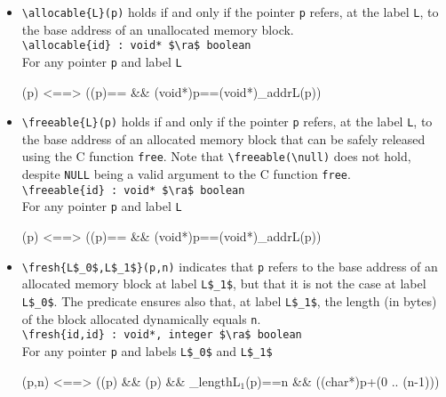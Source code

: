 \begin{itemize}
\item \lstinline|\allocable{L}(p)|
holds if and only if
the pointer \lstinline|p| refers, at the label \lstinline|L|,
to the base address of
an unallocated memory block.
\\ \makebox[5mm]{} \lstinline|\allocable{id} : void* $\ra$ boolean|
\\
For any pointer \lstinline|p| and label \lstinline|L|
\begin{listing-nonumber}
(p) <==> ((p)==\unallocated
                         && (void*)p==(void*)\base_addr{L}(p))
\end{listing-nonumber}

\item \lstinline|\freeable{L}(p)|
holds if and only if
the pointer \lstinline|p| refers, at the label \lstinline|L|,
to the base address of an allocated memory block
that can be safely released using the C function \lstinline|free|.
Note that \lstinline|\freeable(\null)| does not hold, despite \lstinline|NULL|
being a valid argument to the C function \lstinline|free|.
\\ \makebox[5mm]{} \lstinline|\freeable{id} : void* $\ra$ boolean|
\\
For any pointer \lstinline|p| and label \lstinline|L|
\begin{listing-nonumber}
(p) <==> ((p)==\dynamic
                        && (void*)p==(void*)\base_addr{L}(p))
\end{listing-nonumber}

\item \lstinline|\fresh{L$_0$,L$_1$}(p,n)|
  indicates that \lstinline|p| refers to the base address of an allocated memory block at label
  \lstinline|L$_1$|,
  but that it is not the case at label \lstinline|L$_0$|.
  The predicate ensures also that, at label \lstinline|L$_1$|, the length
  (in bytes) of the block allocated dynamically equals  \lstinline|n|.
\\ \makebox[5mm]{} \lstinline|\fresh{id,id} : void*, integer $\ra$ boolean|
\\
For any pointer \lstinline|p| and labels \lstinline|L$_0$| and \lstinline|L$_1$|
\begin{listing-nonumber}
(p,n) <==> ((p) && (p) &&
                         \block_length{L$_1$}(p)==n &&
                         ((char*)p+(0 .. (n-1)))
\end{listing-nonumber}
\end{itemize}

